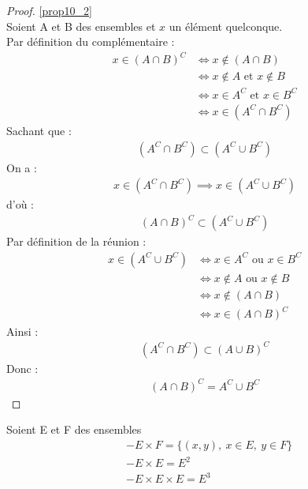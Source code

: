 \begin{proof}
	\ref{prop10_2} 
	\\
	Soient A et B des ensembles et $x$ un élément quelconque. \\
	\framebox{$\subset$} Par définition du complémentaire :
	\begin{align*}
		x \in (A \cap B)^C &\iff x \notin (A \cap B) \\ 
		&\iff x \notin A \text{ et } x \notin B \\
		&\iff x \in A^C \text{ et } x \in B^C \\
		&\iff x \in (A^C \cap B^C)
	\end{align*}
	Sachant que :
	\begin{align*}
		(A^C \cap B^C) \subset (A^C \cup B^C)
	\end{align*}
	On a :
	\begin{align*}
		x \in (A^C \cap B^C) \implies x \in (A^C \cup B^C)
	\end{align*}
	d'où :
	\begin{align*}
		(A \cap B)^C \subset (A^C \cup B^C)
	\end{align*}
	\framebox{$\supset$} Par définition de la réunion :
	\begin{align*}
		x \in (A^C \cup B^C) &\iff x \in A^C \text{ ou } x \in B^C \\
		&\iff x \notin A \text{ ou } x \notin B \\
		&\iff x \notin (A \cap B) \\
		&\iff x \in (A \cap B)^C
	\end{align*}
	Ainsi : 
	\begin{align*}
		(A^C \cap B^C) \subset (A \cup B)^C
	\end{align*}
	Donc :
	\begin{align*}
		(A \cap B)^C = A^C \cup B^C
	\end{align*}
\end{proof}

\begin{definition}
	Soient E et F des ensembles
	\begin{align*}
		&- E \times F = \{(x, y),\ x \in E,\ y \in F\} \\
		&- E \times E = E^2 \\
		&- E \times E \times E = E^3
	\end{align*}
\end{definition}